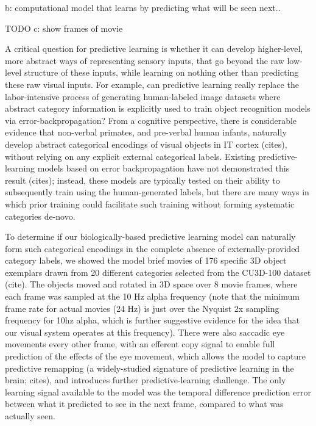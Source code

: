 \documentclass[11pt,twoside]{article}
\newif\myifpdf
\begin{document}
b: computational model that learns by predicting what will be seen next.. 

TODO c: show frames of movie

A critical question for predictive learning is whether it can develop higher-level, more abstract ways of representing sensory inputs, that go beyond the raw low-level structure of these inputs, while learning on nothing other than predicting these raw visual inputs.  For example, can predictive learning really replace the labor-intensive process of generating human-labeled image datasets where abstract category information is explicitly used to train object recognition models via error-backpropagation?  From a cognitive perspective, there is considerable evidence that non-verbal primates, and pre-verbal human infants, naturally develop abstract categorical encodings of visual objects in IT cortex (cites), without relying on any explicit external categorical labels.  Existing predictive-learning models based on error backpropagation have not demonstrated this result (cites); instead, these models are typically tested on their ability to subsequently train using the human-generated labels, but there are many ways in which prior training could facilitate such training without forming systematic categories de-novo.

To determine if our biologically-based predictive learning model can naturally form such categorical encodings in the complete absence of externally-provided category labels, we showed the model brief movies of 176 specific 3D object exemplars drawn from 20 different categories selected from the CU3D-100 dataset (cite).  The objects moved and rotated in 3D space over 8 movie frames, where each frame was sampled at the 10 Hz alpha frequency (note that the minimum frame rate for actual movies (24 Hz) is just over the Nyquist 2x sampling frequency for 10hz alpha, which is further suggestive evidence for the idea that our visual system operates at this frequency).  There were also saccadic eye movements every other frame, with an efferent copy signal to enable full prediction of the effects of the eye movement, which allows the model to capture predictive remapping (a widely-studied signature of predictive learning in the brain; cites), and introduces further predictive-learning challenge.  The only learning signal available to the model was the temporal difference prediction error between what it predicted to see in the next frame, compared to what was actually seen.  
\end{document}
